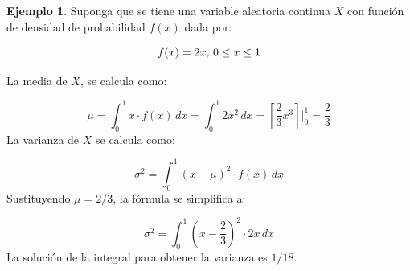 \documentclass[
  11pt,
]{book}
\theoremstyle{definition}
\theoremstyle{definition}
\newtheorem{example}{Ejemplo}[chapter]
\theoremstyle{definition}
\theoremstyle{definition}
\theoremstyle{remark}
\begin{document}
\begin{example}
Suponga que se tiene una variable aleatoria continua \(X\) con función de densidad de probabilidad \(f(x)\) dada por:

\begin{equation}
\notag
f(x) = 2x \text{, } 0 \leq x \leq 1 \\
\end{equation}

La media de \(X\), se calcula como:

\[\mu = \int_{0}^{1} x \cdot f(x) \, dx = \int_{0}^{1} 2x^2 \, dx = \left[ \frac{2}{3} x^3 \right] \bigg|_{0}^{1} = \frac{2}{3}\]
La varianza de \(X\) se calcula como:

\[\sigma^2 = \int_{0}^{1} (x - \mu)^2 \cdot f(x) \, dx\]
Sustituyendo \(\mu= 2/3\), la fórmula se simplifica a:

\[\sigma^2 = \int_{0}^{1} \left( x - \frac{2}{3} \right)^2 \cdot 2x \, dx\]
La solución de la integral para obtener la varianza es \(1/18\).
\end{example}
\end{document}
